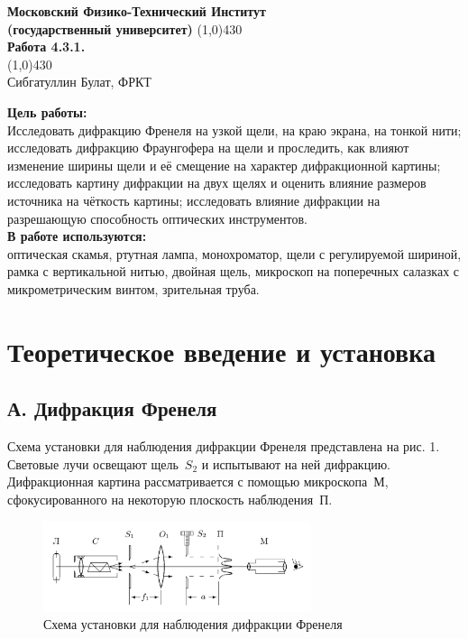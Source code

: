 \documentclass[a4paper, 12pt]{article}%
\begin{document}
\begin{titlepage}

\begin{center}
\large\textbf{Московский Физико-Технический Институт}\\
\large\textbf{(государственный университет)}
\vfill
\line(1,0){430}\\[1mm]
\huge\textbf{Работа 4.3.1.}\\
\line(1,0){430}\\[1mm]
\vfill
\large Сибгатуллин Булат, ФРКТ\\
\end{center}

\end{titlepage}
\noindent \textbf{Цель работы:} \\
\indent Исследовать дифракцию Френеля на узкой щели, на краю экрана, на тонкой нити; исследовать дифракцию Фраунгофера на щели и проследить, как влияют изменение ширины щели и её смещение на характер дифракционной картины; исследовать картину дифракции на двух щелях и оценить влияние размеров источника на чёткость картины; исследовать влияние дифракции на разрешающую способность оптических инструментов.\\
\noindent \textbf{В работе используются:} \\
\indent оптическая скамья, ртутная лампа, монохроматор, щели с регулируемой шириной, рамка с вертикальной нитью, двойная щель, микроскоп на поперечных салазках с микрометрическим винтом, зрительная труба.

\section*{Теоретическое введение и установка}
	\subsection*{А. Дифракция Френеля}
	
	Схема установки для наблюдения дифракции Френеля представлена на рис. 1. Световые лучи освещают щель~$S_2$ и испытывают на ней дифракцию. Дифракционная картина рассматривается с помощью микроскопа~М, сфокусированного на некоторую плоскость наблюдения~П.
		\begin{figure}[h]
		\begin{center}
			\includegraphics[width = 0.7\textwidth]{images/431-1.png}
			\caption{Схема установки для наблюдения дифракции Френеля}
		\end{center}
	\end{figure}
	
\end{document}
